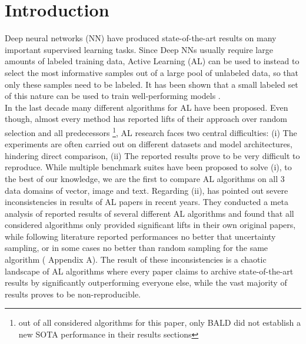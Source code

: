 \documentclass[]{article}
\begin{document}
\section{Introduction}
Deep neural networks (NN) have produced state-of-the-art results on many important supervised learning tasks.
Since Deep NNs usually require large amounts of labeled training data, Active Learning (AL) can be used to instead to select the most informative samples out of a large pool of unlabeled data, so that only these samples need to be labeled.
It has been shown that a small labeled set of this nature can be used to train well-performing models \cite{beck2021effective, hu2021towards, li2022empirical, zhou2021towards}. \\
In the last decade many different algorithms for AL have been proposed.
Even though, almost every method has reported lifts of their approach over random selection and all predecessors \footnote{out of all considered algorithms for this paper, only BALD \cite{gal2017deep} did not establish a new SOTA performance in their results sections}, AL research faces two central difficulties:
(i) The experiments are often carried out on different datasets and model architectures, hindering direct comparison,
(ii) The reported results prove to be very difficult to reproduce.
While multiple benchmark suites have been proposed to solve (i), to the best of our knowledge, we are the first to compare AL algorithms on all 3 data domains of vector, image and text.
Regarding (ii), \cite{zhou2021towards} has pointed out severe inconsistencies in results of AL papers in recent years. 
They conducted a meta analysis of reported results of several different AL algorithms and found that all considered algorithms only provided significant lifts in their own original papers, while following literature reported performances no better that uncertainty sampling, or in some cases no better than random sampling for the same algorithm (\cite{zhou2021towards} Appendix A).
The result of these inconsistencies is a chaotic landscape of AL algorithms where every paper claims to archive state-of-the-art results by significantly outperforming everyone else, while the vast majority of results proves to be non-reproducible. \\
\end{document}
